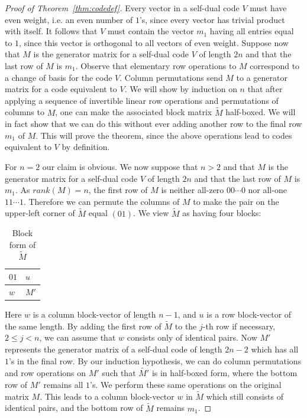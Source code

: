 \documentclass[noams]{compositio}
\theoremstyle{definition} %
\theoremstyle{remark} %
\begin{document}
\begin{proof}[Proof of Theorem~\ref{thm:codedef}]

Every vector in a self-dual code $V$ must have even weight, i.e. an even number of $1$'s, since
every vector has trivial product with itself.  It
follows that $V$ must contain the  vector $m_1$ having all entries equal to $1$,
since this vector is orthogonal to all vectors of even weight.  Suppose now that
$M$ is the generator matrix for a self-dual code $V$ of length $2n$ and that the last
row of $M$ is $m_1$.  Observe that elementary row operations to $M$ correspond to a change of basis for the code $V$. Column permutations send $M$ to a generator matrix for a code equivalent to $V$. We will show by induction on $n$ that after applying a sequence
of invertible linear row operations and permutations of columns to $M$, one can make
the associated block matrix $\tilde{M}$ half-boxed.  We will in fact show that we can do
this without ever adding another row to the final row $m_1$ of $M$.  This will prove
the theorem, since the above operations lead to codes equivalent to $V$ by definition.

For $n = 2$ our claim is obvious.  We now suppose that $n > 2$ and that $M$ is the generator matrix for a self-dual code $V$ of length $2n$ and that the last
row of $M$ is $m_1$.  As $rank(M)=n$, the first row of $M$ is neither all-zero $00\cdots 0$ nor all-one $11\cdots 1$. Therefore we can permute the columns of $M$ to make the pair on the upper-left corner of $\tilde{M}$ equal $(01)$. We view $\tilde{M}$ as having four blocks:

\begin{table}[ht]
\caption{Block form of $\tilde{M}$}
\label{tab:block}
\centering
\begin{tabular}{|l|l|}
\hline
 $01$ & $u$ \\
 \hline
 $w$  & $M'$\\
 \hline
\end{tabular}
\end{table}
\noindent Here $w$ is a column block-vector of length $n-1$, and $u$ is a row block-vector of the same length. By adding the first row of $\tilde{M}$ to the $j$-th row if necessary, $2\leq j<n$, we can assume that $w$ consists only of identical pairs. Now $M'$ represents the generator matrix of a self-dual code of length $2n-2$ which has all $1$'s
in the final row. By our induction hypothesis, we can do column permutations and row operations on $M'$ such that $\tilde{M'}$ is in half-boxed form, where the bottom row of $M'$ remains all $1$'s. We perform these same operations
on the original matrix $M$.  This leads to a column block-vector $w$ in $\tilde {M}$ which still consists of identical pairs,
and the bottom row of $\tilde{M}$  remains $m_1$.


\end{proof}
\end{document}
